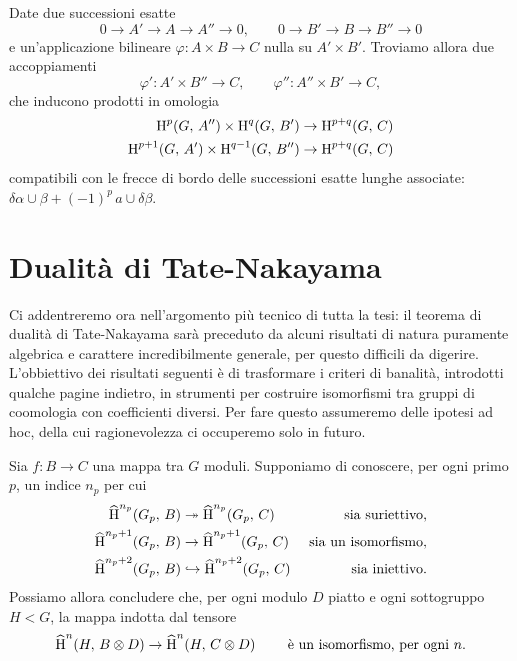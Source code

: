 \begin{lemma}\label{cup2}
	Date due successioni esatte
	\[ 0 \to A' \to A \to A'' \to 0, \qquad 0 \to B' \to B \to B'' \to 0 \]
	e un'applicazione bilineare $  \varphi\colon A \times B \to C $ nulla su $ A'\times B' $. Troviamo allora due accoppiamenti
	\[ \varphi'\colon A' \times B'' \to C, \qquad \varphi''\colon A'' \times B' \to C, \]
	che inducono prodotti in omologia
	\begin{align*}
		\operatorname{H}^{p}(G, \, A'') \times \operatorname{H}^{q}(G, \, B') &\to \operatorname{H}^{p+q}(G, \, C)\\
		\operatorname{H}^{p+1}(G, \, A') \times \operatorname{H}^{q-1}(G, \, B'') &\to \operatorname{H}^{p+q}(G, \, C)
	\end{align*}
	compatibili con le frecce di bordo delle successioni esatte lunghe associate:  $ \delta \alpha \cup \beta + (-1)^p \, a \cup \delta \beta $.
\end{lemma}

\section{Dualità di Tate-Nakayama}
Ci addentreremo ora nell'argomento più tecnico di tutta la tesi: il teorema di dualità di Tate-Nakayama sarà preceduto da alcuni risultati di natura puramente algebrica e carattere incredibilmente generale, per questo difficili da digerire. L'obbiettivo dei risultati seguenti è di trasformare i criteri di banalità, introdotti qualche pagine indietro, in strumenti per costruire isomorfismi tra gruppi di coomologia con coefficienti diversi. Per fare questo assumeremo delle ipotesi ad hoc, della cui ragionevolezza ci occuperemo solo in futuro. 

\begin{proposition}
	Sia $ f \colon B \to C $ una mappa tra $ G $ moduli. Supponiamo di conoscere, per ogni primo $ p $, un indice $ n_p $ per cui
	\begin{align*}
		\operatorname{\widehat{H}}^{n_p}(G_p,\, B) &\twoheadrightarrow \operatorname{\widehat{H}}^{n_p}(G_p,\, C) & \text{ sia suriettivo,} \\
		\operatorname{\widehat{H}}^{n_p+1}(G_p,\, B) &\to \operatorname{\widehat{H}}^{n_p+1}(G_p,\, C) & \text{ sia un isomorfismo,} \\
		\operatorname{\widehat{H}}^{n_p+2}(G_p,\, B) &\hookrightarrow \operatorname{\widehat{H}}^{n_p+2}(G_p,\, C) & \text{ sia iniettivo.}
	\end{align*}
	Possiamo allora concludere che, per ogni modulo $ D $ piatto e ogni sottogruppo $ H < G $, la mappa indotta dal tensore
	\[ \operatorname{\widehat{H}}^n(H, \, B \otimes D) \to \operatorname{\widehat{H}}^n(H, \, C \otimes D) \qquad\text{ è un isomorfismo, per ogni } n. \]
\end{proposition}

